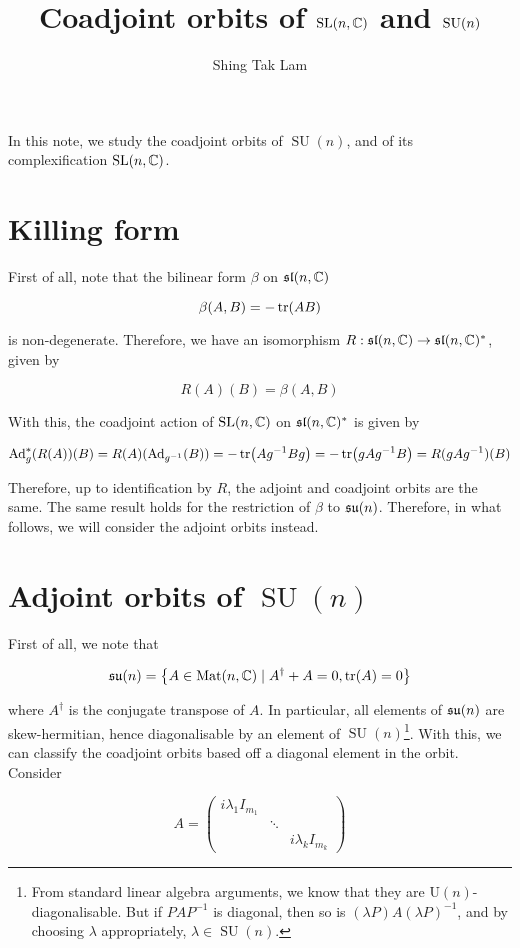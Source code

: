 \documentclass{article}
\title{Coadjoint orbits of \(\operatorname{SL}(n, \mathbb{C})\) and \(\SU(n)\)}
\author{Shing Tak Lam}
\renewcommand{\sl}{\mfs\mfl}
\DeclareMathOperator{\SU}{SU}
\newcommand{\su}{\mfs\mfu}
\newcommand{\rU}{\mathrm{U}}
\begin{document}
\maketitle

In this note, we study the coadjoint orbits of \(\SU(n)\), and of its complexification \(\operatorname{SL}(n, \mathbb{C})\).

\section{Killing form}

First of all, note that the bilinear form \(\beta\) on \(\sl(n, \C)\)

\[\beta(A, B) = -\tr(AB)\]

is non-degenerate. Therefore, we have an isomorphism \(R : \sl(n, \C) \to \sl(n, \C)^*\), given by

\[R(A)(B) = \beta(A, B)\]

With this, the coadjoint action of \(\operatorname{SL}(n, \mathbb{C})\) on \(\sl(n, \C)^*\) is given by

\[\operatorname{Ad}_g^*(R(A))(B) = R(A)(\operatorname{Ad}_{g^{-1}}(B)) = -\tr(Ag^{-1}Bg) = -\tr(gAg^{-1}B) = R(gAg^{-1})(B)\]

Therefore, up to identification by \(R\), the adjoint and coadjoint orbits are the same. The same result holds for the restriction of \(\beta\) to \(\su(n)\). Therefore, in what follows, we will consider the adjoint orbits instead.

\section{Adjoint orbits of \(\SU(n)\)}

First of all, we note that

\[\su(n) = \left\{A \in \Mat(n, \C) \mid A^\dagger + A = 0, \tr(A) = 0\right\}\]

where \(A^\dagger\) is the conjugate transpose of \(A\). In particular, all elements of \(\su(n)\) are skew-hermitian, hence diagonalisable by an element of \(\SU(n)\)\footnote{From standard linear algebra arguments, we know that they are \(\rU(n)\)-diagonalisable. But if \(PAP^{-1}\) is diagonal, then so is \((\lambda P)A(\lambda P)^{-1}\), and by choosing \(\lambda\) appropriately, \(\lambda \in \SU(n)\).}. With this, we can classify the coadjoint orbits based off a diagonal element in the orbit. Consider

\[A = \begin{pmatrix}
    i\lambda_1 I_{m_1} \\
    & \ddots \\
    & & i\lambda_k I_{m_k}
\end{pmatrix}\]
\end{document}
